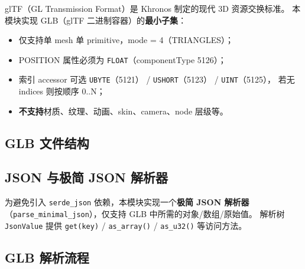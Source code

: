 \documentclass[11pt,a4paper]{article}
\begin{document}
glTF（GL Transmission Format）是 Khronos 制定的现代 3D 资源交换标准。
本模块实现 GLB（glTF 二进制容器）的\textbf{最小子集}：

\begin{itemize}
  \item 仅支持单 mesh 单 primitive，mode = 4（TRIANGLES）；
  \item POSITION 属性必须为 \texttt{FLOAT}（componentType 5126）；
  \item 索引 accessor 可选 \texttt{UBYTE}（5121） / \texttt{USHORT}（5123） / \texttt{UINT}（5125），
        若无 indices 则按顺序 0..N；
  \item \textbf{不支持}材质、纹理、动画、skin、camera、node 层级等。
\end{itemize}

\subsection{GLB 文件结构}

\begin{center}
\end{center}

\subsection{JSON 与极简 JSON 解析器}

为避免引入 \texttt{serde\_json} 依赖，本模块实现一个\textbf{极简 JSON 解析器}
（\texttt{parse\_minimal\_json}），仅支持 GLB 中所需的对象/数组/原始值。
解析树 \texttt{JsonValue} 提供 \texttt{get(key)} / \texttt{as\_array()} / \texttt{as\_u32()}
等访问方法。

\subsection{GLB 解析流程}
\end{document}
